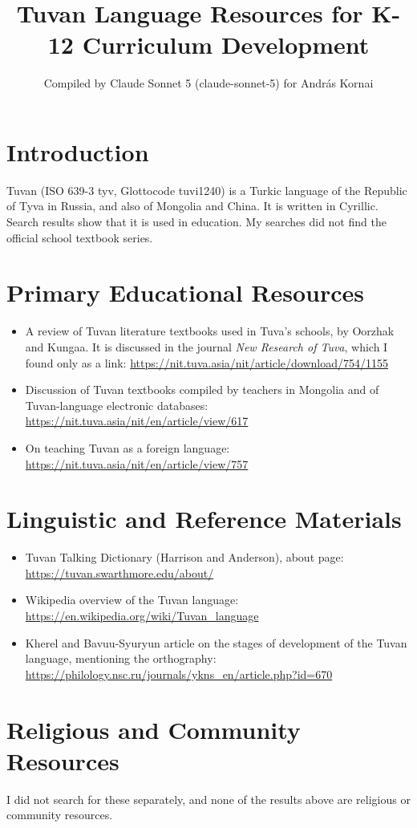 \documentclass[12pt]{article}
\title{Tuvan Language Resources for K-12 Curriculum Development}
\author{Compiled by Claude Sonnet 5 (claude-sonnet-5) for Andr\'as Kornai}
\date{}
\begin{document}
\maketitle

\section{Introduction}
Tuvan (ISO 639-3 tyv, Glottocode tuvi1240) is a Turkic language of the Republic of Tyva in Russia, and also of Mongolia and China. It is written in Cyrillic. Search results show that it is used in education. My searches did not find the official school textbook series.

\section{Primary Educational Resources}
\begin{itemize}
\item A review of Tuvan literature textbooks used in Tuva's schools, by Oorzhak and Kungaa. It is discussed in the journal \textit{New Research of Tuva}, which I found only as a link: \url{https://nit.tuva.asia/nit/article/download/754/1155}
\item Discussion of Tuvan textbooks compiled by teachers in Mongolia and of Tuvan-language electronic databases: \url{https://nit.tuva.asia/nit/en/article/view/617}
\item On teaching Tuvan as a foreign language: \url{https://nit.tuva.asia/nit/en/article/view/757}
\end{itemize}

\section{Linguistic and Reference Materials}
\begin{itemize}
\item Tuvan Talking Dictionary (Harrison and Anderson), about page: \url{https://tuvan.swarthmore.edu/about/}
\item Wikipedia overview of the Tuvan language: \url{https://en.wikipedia.org/wiki/Tuvan_language}
\item Kherel and Bavuu-Syuryun article on the stages of development of the Tuvan language, mentioning the orthography: \url{https://philology.nsc.ru/journals/ykns_en/article.php?id=670}
\end{itemize}

\section{Religious and Community Resources}
I did not search for these separately, and none of the results above are religious or community resources.
\end{document}
